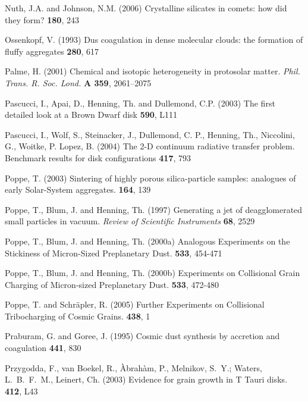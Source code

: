 \begin{literature}
\item 
Nuth, J.A. and Johnson, N.M. (2006) Crystalline silicates in comets:
how did they form? \ica \textbf{180}, 243

\item
Ossenkopf, V. (1993)  Dus coagulation in dense molecular clouds: the
formation of fluffy aggregates  \aap \textbf{280}, 617

\item
Palme, H. (2001) Chemical and isotopic heterogeneity in protosolar 
matter. \textit{Phil. Trans. R. Soc. Lond.} \textbf{A 359}, 2061--2075

\item
Pascucci, I., Apai, D., Henning, Th. and Dullemond, C.P. (2003) 
The first detailed look at a Brown Dwarf disk \apj \textbf{590}, L111

\item
Pascucci, I., Wolf, S., Steinacker, J., Dullemond, C. P., Henning, Th.,
Niccolini, G., Woitke, P. Lopez, B. (2004) The 2-D continuum radiative
transfer problem. Benchmark results for disk configurations \aap
\textbf{417}, 793

\item
Poppe, T. (2003) Sintering of highly porous silica-particle samples:
analogues of early Solar-System aggregates. \ica \textbf{164}, 139

\item
Poppe, T., Blum, J. and Henning, Th. (1997) Generating a jet of
deagglomerated small particles in vacuum. \textit{Review of Scientific
Instruments\/} \textbf{68}, 2529

\item
Poppe, T., Blum, J. and Henning, Th. (2000a) Analogous Experiments on the
Stickiness of Micron-Sized Preplanetary Dust. \apj \textbf{533}, 454-471

\item
Poppe, T., Blum, J. and Henning, Th. (2000b) Experiments on Collisional Grain
Charging of Micron-sized Preplanetary Dust. \apj \textbf{533}, 472-480

\item
Poppe, T. and Schr\"apler, R. (2005) Further Experiments on Collisional
Tribocharging of Cosmic Grains. \aap \textbf{438}, 1

\item
Praburam, G. and Goree, J. (1995) Cosmic dust synthesis by accretion and
coagulation  \apj \textbf{441}, 830

\item
Przygodda, F., van Boekel, R., \`Abrah\`am, P., Melnikov, S.~Y.; Waters,
L.~B.~F.~M., Leinert, Ch. (2003) Evidence for grain growth in T Tauri disks.
\aap \textbf{412}, L43


\end{literature}
